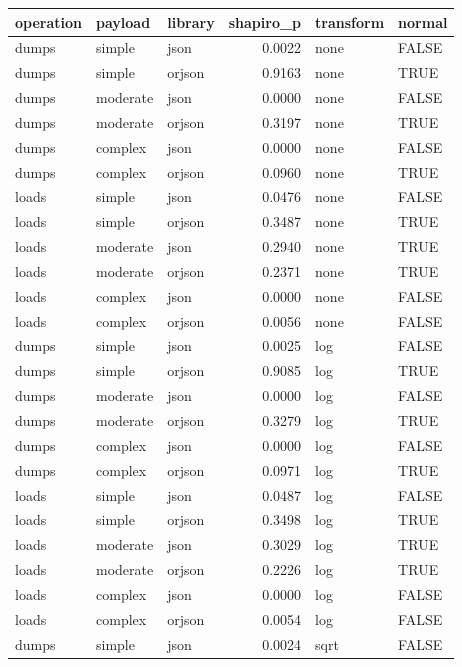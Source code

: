 \begin{table}[ht]
\centering
\begin{tabular}{lllrll}
  \toprule
operation & payload & library & shapiro\_p & transform & normal \\ 
  \midrule
dumps & simple & json & 0.0022 & none & FALSE \\ 
  dumps & simple & orjson & 0.9163 & none & TRUE \\ 
  dumps & moderate & json & 0.0000 & none & FALSE \\ 
  dumps & moderate & orjson & 0.3197 & none & TRUE \\ 
  dumps & complex & json & 0.0000 & none & FALSE \\ 
  dumps & complex & orjson & 0.0960 & none & TRUE \\ 
  loads & simple & json & 0.0476 & none & FALSE \\ 
  loads & simple & orjson & 0.3487 & none & TRUE \\ 
  loads & moderate & json & 0.2940 & none & TRUE \\ 
  loads & moderate & orjson & 0.2371 & none & TRUE \\ 
  loads & complex & json & 0.0000 & none & FALSE \\ 
  loads & complex & orjson & 0.0056 & none & FALSE \\ 
  dumps & simple & json & 0.0025 & log & FALSE \\ 
  dumps & simple & orjson & 0.9085 & log & TRUE \\ 
  dumps & moderate & json & 0.0000 & log & FALSE \\ 
  dumps & moderate & orjson & 0.3279 & log & TRUE \\ 
  dumps & complex & json & 0.0000 & log & FALSE \\ 
  dumps & complex & orjson & 0.0971 & log & TRUE \\ 
  loads & simple & json & 0.0487 & log & FALSE \\ 
  loads & simple & orjson & 0.3498 & log & TRUE \\ 
  loads & moderate & json & 0.3029 & log & TRUE \\ 
  loads & moderate & orjson & 0.2226 & log & TRUE \\ 
  loads & complex & json & 0.0000 & log & FALSE \\ 
  loads & complex & orjson & 0.0054 & log & FALSE \\ 
  dumps & simple & json & 0.0024 & sqrt & FALSE \\ 

\end{tabular}
\end{table}
